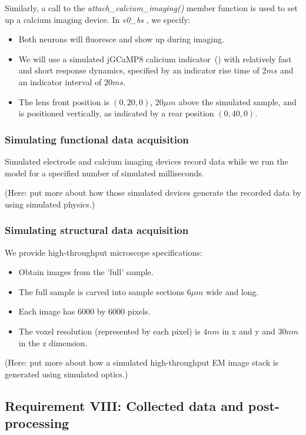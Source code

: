 \documentclass{ldr-article}
\def\firstexp{\textit{e0\_bs} }
\begin{document}
Similarly, a call to the \textit{attach\_calcium\_imaging()} member function is used to set up a calcium imaging device. In \firstexp, we specify:
\begin{itemize}
	\item Both neurons will fluoresce and show up during imaging.
	\item We will use a simulated jGCaMP8 calicium indicator~(\cite{zhang2023}) with relatively fast and short response dynamics, specified by an indicator rise time of $2 ms$ and an indicator interval of $20 ms$.
	\item The lens front position is $(0, 20, 0)$, $20 \mu m$ above the simulated sample, and is positioned vertically, as indicated by a rear position $(0, 40, 0)$.
\end{itemize}

\subsubsection{Simulating functional data acquisition}

Simulated electrode and calcium imaging devices record data while we run the model for a specified number of simulated milliseconds.

(Here: put more about how those simulated devices generate the recorded data by using simulated physics.)

\subsubsection{Simulating structural data acquisition}

We provide high-throughput microscope specifications:
\begin{itemize}
	\item Obtain images from the 'full' sample.
	\item The full sample is carved into sample sections $6 \mu m$ wide and long.
	\item Each image has $6000$ by $6000$ pixels.
	\item The voxel resolution (represented by each pixel) is $4 nm$ in x and y and $30 nm$ in the z dimension.
\end{itemize}

(Here: put more about how a simulated high-throughput EM image stack is generated using simulated optics.)

\subsection{Requirement VIII: Collected data and post-processing}
\end{document}
